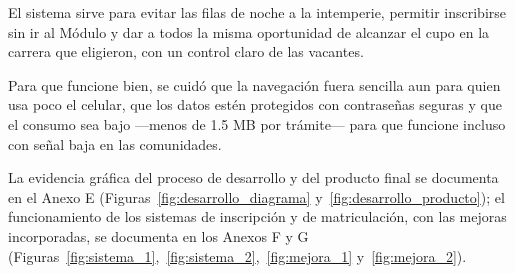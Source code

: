 El sistema sirve para evitar las filas de noche a la intemperie, permitir inscribirse sin ir al Módulo y dar a todos la misma oportunidad de alcanzar el cupo en la carrera que eligieron, con un control claro de las vacantes.

Para que funcione bien, se cuidó que la navegación fuera sencilla aun para quien usa poco el celular, que los datos estén protegidos con contraseñas seguras y que el consumo sea bajo —menos de 1.5 MB por trámite— para que funcione incluso con señal baja en las comunidades.

La evidencia gráfica del proceso de desarrollo y del producto final se documenta en el Anexo E (Figuras~\ref{fig:desarrollo_diagrama} y~\ref{fig:desarrollo_producto}); el funcionamiento de los sistemas de inscripción y de matriculación, con las mejoras incorporadas, se documenta en los Anexos F y G (Figuras~\ref{fig:sistema_1},~\ref{fig:sistema_2},~\ref{fig:mejora_1} y~\ref{fig:mejora_2}).
